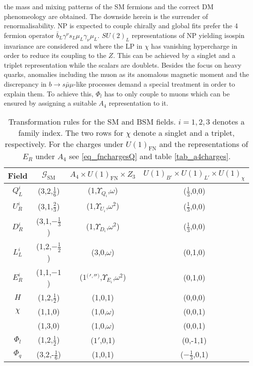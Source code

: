 the mass and mixing patterns of the SM fermions and the correct DM phenomeology are obtained. 
The downside herein is the surrender of renormalisability. NP is expected to couple chirally and global fits prefer the 4 fermion operator 
$\bar b_L \gamma^\nu s_L \mu_L \gamma_\nu \mu_L$. $SU(2)_L$ representations of NP yielding isospin invariance are considered and where the LP in
$\chi$ has vanishing hypercharge in order to reduce its coupling to the $Z$. This can be achieved by a singlet and a triplet representation while
the scalars are doublets.
Besides the focus on heavy quarks, anomalies including the muon as its anomalous magnetic moment and the discrepancy in  
$b\rightarrow s\bar\mu\mu$-like processes demand a special treatment in order to explain them.
To achieve this, $\Phi_l$ has to only couple to muons which can be ensured by assigning a suitable $A_4$ representation to it. 
\begin{table}[t]
 \begin{tabular}{c|c|c|c}
  Field & $\mathcal{G}_\text{SM}$ & $A_4 \times U(1)_\text{FN} \times Z_3$ & $U(1)_{B'}\times U(1)_{L'}\times U(1)_\chi$\\
  \hline
  $Q^i_L$ & (3,2,$\frac16$) & (1,$\Upsilon_{Q_i}$,$\omega$) & ($\frac13$,0,0)\\
  $U^i_R$ & (3,1,$\frac23$) & (1,$\Upsilon_{U_i}$,$\omega^2$)& ($\frac13$,0,0)\\
  $D^i_R$ & (3,1,$-\frac13$) & (1,$\Upsilon_{D_i}$,$\omega^2$)& ($\frac13$,0,0)\\
  $L^i_L$ & (1,2,$-\frac12$) & (3,0,$\omega$)& (0,1,0)\\
  $E^i_R$ & (1,1,$-1$) & ($1 {^(} {'} {^,} '' {^)} $,$\Upsilon_{E_i}$,$\omega^2$)& (0,1,0)\\
  $H$ & (1,2,$\frac12$) & (1,0,1)& (0,0,0)\\
  \hline
  $\chi$ & (1,1,0) & (1,0,$\omega$)& (0,0,1)\\ %
 & (1,3,0) & (1,0,$\omega$)&(0,0,1)\\
  $\Phi_l$ & (1,2,$\frac12$) & ($1'$,0,1)& (0,-1,1)\\
  $\Phi_q$ & (3,2,-$\frac16$) & ($1$,0,1)& ($-\frac13$,0,1)\\
 \end{tabular}
\caption{Transformation rules for the SM and BSM fields. $i=1,2,3$ denotes a family index. The two rows for $\chi$ denote a singlet and a triplet, respectively. For the charges under 
$U(1)_\text{FN}$ and the representations of $E_R$ under $A_4$ see \eqref{eq_fnchargesQ} and table \ref{tab_a4charges}.}
\label{tab_models}
\end{table}
